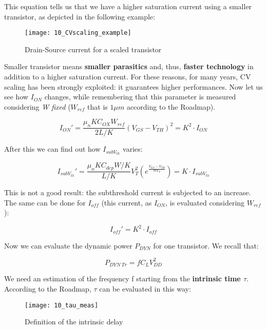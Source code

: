 \documentclass[a4paper, 12pt, twoside, openright]{report}
\begin{document}
\begin{enumerate}
This equation tells us that we have a higher saturation current using a smaller transistor, as depicted in the following example:

	\begin{figure}[H]
	\centering
	\texttt{[image: 10\_CVscaling\_example]}
	\caption{Drain-Source current for a scaled transistor}
	\label{}
	\end{figure}

Smaller transistor means \textbf{smaller parasitics} and, thus, \textbf{faster technology} in addition to a higher saturation current. For these reasons, for many years, CV scaling has been strongly exploited: it guarantees higher performances.
Now let us see how $I_{ON}$ changes, while remembering that this parameter is measured considering \emph{W fixed} ($W_{ref}$ that is $1 \mu m$ according to the Roadmap).

	\begin{equation}
	I_{ON}' = \frac{\mu_n K C_{OX} W_{ref}}{2 L/K}(V_{GS} - V_{TH})^2 = K^2 \cdot I_{ON}
	\end{equation}

After this we can find out how $I_{subV_{th}}$ varies:

	\begin{equation}
	I_{subV_{th}}' = \frac{\mu_n K C_{dep} W/K}{L/K} V_{T}^2 \left( e^{\frac{V_{GS} - V_{TH}}{mV_T}} \right) = K \cdot I_{subV_{th}}
	\end{equation}

This is not a good result: the subthreshold current is subjected to an increase.
The same can be done for $I_{off}$ (this current, as $I_{ON}$, is evaluated considering $W_{ref}$):

	\begin{equation}
	I_{off}' = K^2 \cdot I_{off}
	\end{equation}

Now we can evaluate the dynamic power $P_{DYN}$ for one transistor. We recall that:

	\begin{equation}
	P_{DYN \ Tr} =f C_L V_{DD}^2
	\end{equation}

We need an estimation of the frequency f starting from the \textbf{intrinsic time $\tau$}. According to the Roadmap, $\tau$ can be evaluated in this way:

	\begin{figure}[H]
	\centering
	\texttt{[image: 10\_tau\_meas]}
	\caption{Definition of the intrinsic delay}
	\label{}
	\end{figure}


\end{enumerate}
\end{document}
